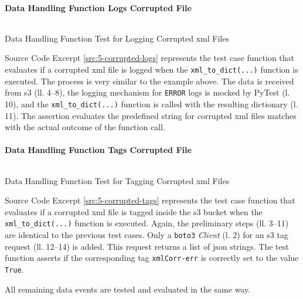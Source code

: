 \paragraph{Data Handling Function Logs Corrupted File}
\begin{listing}[h!]
	\inputminted{python}{main-matter/src/5-corrupted-logs.py}
	\caption{Data Handling Function Test for Logging Corrupted \ac{xml} Files}
	\label{src:5-corrupted-logs}
\end{listing}
Source Code Excerpt \ref{src:5-corrupted-logs} represents the test case function that evaluates if a corrupted \ac{xml} file is logged when the \texttt{xml\_to\_dict(...)} function is executed. The process is very similar to the example above. The data is received from \ac{s3} (ll. 4--8), the logging mechanism for \texttt{ERROR} logs is mocked by PyTest (l. 10), and the \texttt{xml\_to\_dict(...)} function is called with the resulting dictionary (l. 11). The assertion evaluates the predefined string for corrupted \ac{xml} files matches with the actual outcome of the function call.

\paragraph{Data Handling Function Tags Corrupted File}
\begin{listing}[h!]
	\inputminted{python}{main-matter/src/5-corrupted-tags.py}
	\caption{Data Handling Function Test for Tagging Corrupted \ac{xml} Files}
	\label{src:5-corrupted-tags}
\end{listing}
Source Code Excerpt \ref{src:5-corrupted-tags} represents the test case function that evaluates if a corrupted \ac{xml} file is tagged inside the \ac{s3} bucket when the \texttt{xml\_to\_dict(...)} function is executed. Again, the preliminary steps (ll. 3--11) are identical to the previous test cases. Only a \texttt{boto3} \textit{Client} (l. 2) for an \ac{s3} tag request (ll. 12--14) is added. This request returns a list of \ac{json} strings. The test function asserts if the corresponding tag \texttt{xmlCorr-err} is correctly set to the value \texttt{True}.

All remaining data events are tested and evaluated in the same way.

